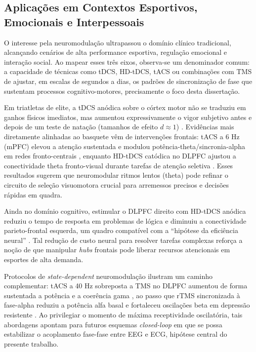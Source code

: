 \subsection{Aplicações em Contextos Esportivos, Emocionais e Interpessoais}
O interesse pela neuromodulação ultrapassou o domínio clínico tradicional, alcançando cenários de alta performance esportiva, regulação emocional e interação social. Ao mapear esses três eixos, observa-se um denominador comum: a capacidade de técnicas como tDCS, HD-tDCS, tACS ou combinações com TMS de ajustar, em escalas de segundos a dias, os padrões de sincronização de fase que sustentam processos cognitivo-motores, precisamente o foco desta dissertação.

Em triatletas de elite, a tDCS anódica sobre o córtex motor não se traduziu em ganhos físicos imediatos, mas aumentou expressivamente o vigor subjetivo antes e depois de um teste de natação (tamanhos de efeito \(d\approx1\)) \cite{valenzuela2019enhancement}. Evidências mais diretamente alinhadas ao basquete vêm de intervenções frontais: tACS a 6 Hz (mPFC) elevou a atenção sustentada e modulou potência-theta/sincronia-alpha em redes fronto-centrais \cite{rostami2020transcranial}, enquanto HD-tDCS catódica no DLPFC ajustou a conectividade theta fronto-visual durante tarefas de atenção seletiva \cite{spooner2020hdtdcs}. Esses resultados sugerem que neuromodular ritmos lentos (theta) pode refinar o circuito de seleção visuomotora crucial para arremessos precisos e decisões rápidas em quadra.

Ainda no domínio cognitivo, estimular o DLPFC direito com HD-tDCS anódica reduziu o tempo de resposta em problemas de lógica e diminuiu a conectividade parieto-frontal esquerda, um quadro compatível com a ``hipótese da eficiência neural'' \cite{arif2021high}. Tal redução de custo neural para resolver tarefas complexas reforça a noção de que manipular \textit{hubs} frontais pode liberar recursos atencionais em esportes de alta demanda.

Protocolos de \emph{state-dependent} neuromodulação ilustram um caminho complementar: tACS a 40 Hz sobreposta a TMS no DLPFC aumentou de forma sustentada a potência e a coerência gama \cite{maiella2022simultaneous}, ao passo que rTMS sincronizada à fase-alpha reduziu a potência alfa basal e fortaleceu oscilações beta em depressão resistente \cite{zrenner2020brain}. Ao privilegiar o momento de máxima receptividade oscilatória, tais abordagens apontam para futuros esquemas \textit{closed-loop} em que se possa estabilizar o acoplamento fase-fase entre EEG e ECG, hipótese central do presente trabalho.

